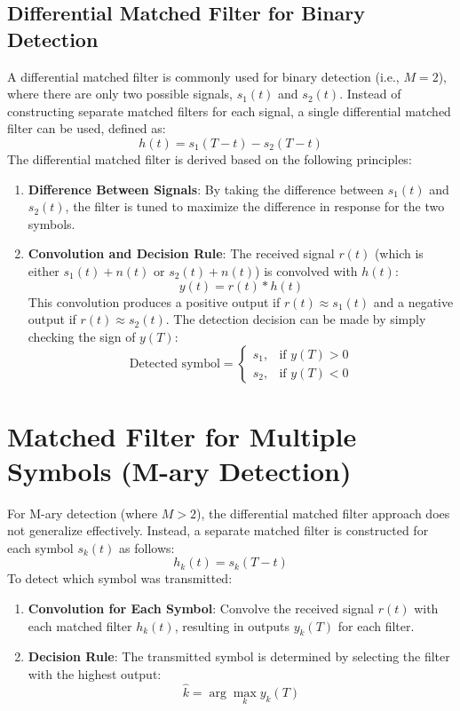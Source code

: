 \documentclass[10pt]{article}
\begin{document}
\subsection{Differential Matched Filter for Binary Detection}
A differential matched filter is commonly used for binary detection (i.e., \( M = 2 \)), where there are only two possible signals, \( s_1(t) \) and \( s_2(t) \). Instead of constructing separate matched filters for each signal, a single differential matched filter can be used, defined as:
\[
h(t) = s_1(T - t) - s_2(T - t)
\]
The differential matched filter is derived based on the following principles:
\begin{enumerate}
    \item \textbf{Difference Between Signals}: By taking the difference between \( s_1(t) \) and \( s_2(t) \), the filter is tuned to maximize the difference in response for the two symbols.
    \item \textbf{Convolution and Decision Rule}: The received signal \( r(t) \) (which is either \( s_1(t) + n(t) \) or \( s_2(t) + n(t) \)) is convolved with \( h(t) \):
    \[
    y(t) = r(t) * h(t)
    \]
    This convolution produces a positive output if \( r(t) \approx s_1(t) \) and a negative output if \( r(t) \approx s_2(t) \). The detection decision can be made by simply checking the sign of \( y(T) \):
    \[
    \text{Detected symbol} =
    \begin{cases}
        s_1, & \text{if } y(T) > 0 \\
        s_2, & \text{if } y(T) < 0
    \end{cases}
    \]
\end{enumerate}

\section{Matched Filter for Multiple Symbols (M-ary Detection)}
For M-ary detection (where \( M > 2 \)), the differential matched filter approach does not generalize effectively. Instead, a separate matched filter is constructed for each symbol \( s_k(t) \) as follows:
\[
h_k(t) = s_k(T - t)
\]
To detect which symbol was transmitted:
\begin{enumerate}
    \item \textbf{Convolution for Each Symbol}: Convolve the received signal \( r(t) \) with each matched filter \( h_k(t) \), resulting in outputs \( y_k(T) \) for each filter.
    \item \textbf{Decision Rule}: The transmitted symbol is determined by selecting the filter with the highest output:
    \[
    \hat{k} = \arg \max_{k} y_k(T)
    \]
\end{enumerate}
\end{document}
